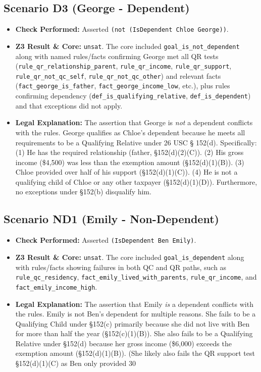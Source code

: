 \documentclass[11pt, letterpaper]{article}
\begin{document}
\subsection{Scenario D3 (George - Dependent)}
\begin{itemize}
    \item \textbf{Check Performed:} Asserted \texttt{(not (IsDependent Chloe George))}.
    \item \textbf{Z3 Result \& Core:} \texttt{unsat}. The core included \texttt{goal\_is\_not\_dependent} along with named rules/facts confirming George met all QR tests (\texttt{rule\_qr\_relationship\_parent}, \texttt{rule\_qr\_income}, \texttt{rule\_qr\_support}, \texttt{rule\_qr\_not\_qc\_self}, \texttt{rule\_qr\_not\_qc\_other}) and relevant facts (\texttt{fact\_george\_is\_father}, \texttt{fact\_george\_income\_low}, etc.), plus rules confirming dependency (\texttt{def\_is\_qualifying\_relative}, \texttt{def\_is\_dependent}) and that exceptions did not apply.
    \item \textbf{Legal Explanation:} The assertion that George is \textit{not} a dependent conflicts with the rules. George qualifies as Chloe's dependent because he meets all requirements to be a Qualifying Relative under 26 USC § 152(d). Specifically: (1) He has the required relationship (father, §152(d)(2)(C)). (2) His gross income (\$4,500) was less than the exemption amount (§152(d)(1)(B)). (3) Chloe provided over half of his support (§152(d)(1)(C)). (4) He is not a qualifying child of Chloe or any other taxpayer (§152(d)(1)(D)). Furthermore, no exceptions under §152(b) disqualify him.
\end{itemize}

\subsection{Scenario ND1 (Emily - Non-Dependent)}
\begin{itemize}
    \item \textbf{Check Performed:} Asserted \texttt{(IsDependent Ben Emily)}.
    \item \textbf{Z3 Result \& Core:} \texttt{unsat}. The core included \texttt{goal\_is\_dependent} along with rules/facts showing failures in both QC and QR paths, such as \texttt{rule\_qc\_residency}, \texttt{fact\_emily\_lived\_with\_parents}, \texttt{rule\_qr\_income}, and \texttt{fact\_emily\_income\_high}.
    \item \textbf{Legal Explanation:} The assertion that Emily \textit{is} a dependent conflicts with the rules. Emily is not Ben's dependent for multiple reasons. She fails to be a Qualifying Child under §152(c) primarily because she did not live with Ben for more than half the year (§152(c)(1)(B)). She also fails to be a Qualifying Relative under §152(d) because her gross income (\$6,000) exceeds the exemption amount (§152(d)(1)(B)). (She likely also fails the QR support test §152(d)(1)(C) as Ben only provided 30%
\end{itemize}
\end{document}
